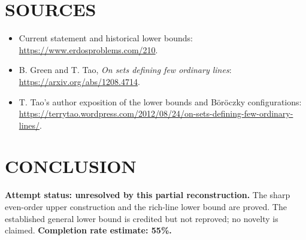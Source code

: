 \section{SOURCES}
\begin{itemize}
\item Current statement and historical lower bounds: \url{https://www.erdosproblems.com/210}.
\item B. Green and T. Tao, \emph{On sets defining few ordinary lines}: \url{https://arxiv.org/abs/1208.4714}.
\item T. Tao's author exposition of the lower bounds and B\"or\"oczky configurations: \url{https://terrytao.wordpress.com/2012/08/24/on-sets-defining-few-ordinary-lines/}.
\end{itemize}
\section{CONCLUSION}
\textbf{Attempt status: unresolved by this partial reconstruction.} The sharp even-order upper construction and the rich-line lower bound are proved. The established general lower bound is credited but not reproved; no novelty is claimed.
\textbf{Completion rate estimate: 55\%.}
